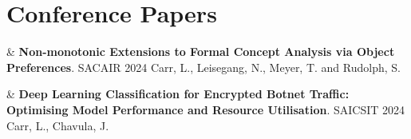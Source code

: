 \documentclass[10pt,a4paper]{article}
\begin{document}


\section{Conference Papers}

\begin{EntriesTableYear}
	  &
	\textbf{Non-monotonic Extensions to Formal Concept Analysis via Object Preferences}.
	\newline
	SACAIR 2024
	\newline
	Carr, L., Leisegang, N., Meyer, T. and Rudolph, S.
	\\
\end{EntriesTableYear}

\begin{EntriesTableYear}
	  &
	\textbf{Deep Learning Classification for Encrypted Botnet Traffic: Optimising Model Performance and Resource Utilisation}.
	\newline
	SAICSIT 2024
	\newline
	Carr, L., Chavula, J.
	\\
\end{EntriesTableYear}




\end{document}
